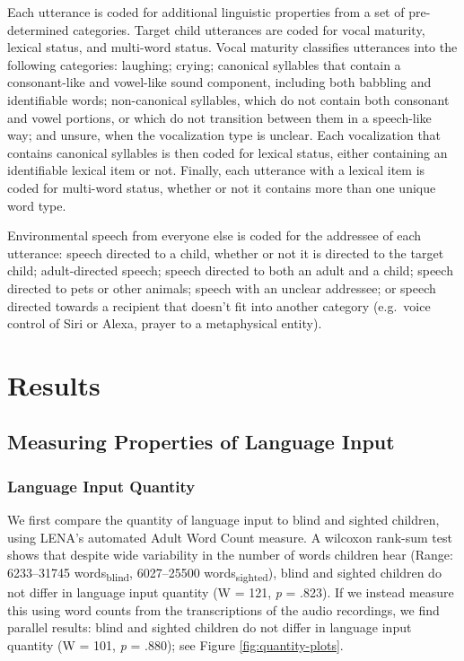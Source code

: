 \documentclass[
  man]{apa6}
\begin{document}
Each utterance is coded for additional linguistic properties from a set of pre-determined categories. Target child utterances are coded for vocal maturity, lexical status, and multi-word status. Vocal maturity classifies utterances into the following categories: laughing; crying; canonical syllables that contain a consonant-like and vowel-like sound component, including both babbling and identifiable words; non-canonical syllables, which do not contain both consonant and vowel portions, or which do not transition between them in a speech-like way; and unsure, when the vocalization type is unclear. Each vocalization that contains canonical syllables is then coded for lexical status, either containing an identifiable lexical item or not. Finally, each utterance with a lexical item is coded for multi-word status, whether or not it contains more than one unique word type.

Environmental speech from everyone else is coded for the addressee of each utterance: speech directed to a child, whether or not it is directed to the target child; adult-directed speech; speech directed to both an adult and a child; speech directed to pets or other animals; speech with an unclear addressee; or speech directed towards a recipient that doesn't fit into another category (e.g.~voice control of Siri or Alexa, prayer to a metaphysical entity).

\hypertarget{results}{%
\section{Results}\label{results}}

\hypertarget{measuring-properties-of-language-input}{%
\subsection{Measuring Properties of Language Input}\label{measuring-properties-of-language-input}}

\hypertarget{language-input-quantity}{%
\subsubsection{Language Input Quantity}\label{language-input-quantity}}

We first compare the quantity of language input to blind and sighted children, using LENA's automated Adult Word Count measure. A wilcoxon rank-sum test shows that despite wide variability in the number of words children hear (Range: 6233--31745 words\textsubscript{blind}, 6027--25500 words\textsubscript{sighted}), blind and sighted children do not differ in language input quantity (W = 121, \emph{p} = .823). If we instead measure this using word counts from the transcriptions of the audio recordings, we find parallel results: blind and sighted children do not differ in language input quantity (W = 101, \emph{p} = .880); see Figure \ref{fig:quantity-plots}.
\end{document}
